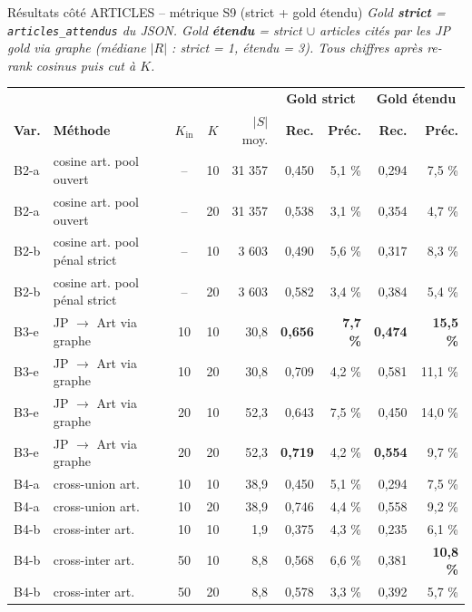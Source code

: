 \documentclass[aspectratio=169,10pt]{beamer}
\begin{document}
\begin{frame}{Résultats côté ARTICLES -- métrique S9 (strict + gold étendu)}
  \tiny
  \textit{Gold \textbf{strict} = \texttt{articles\_attendus} du JSON. \quad
  Gold \textbf{étendu} = strict $\cup$ articles cités par les JP gold via graphe
  (médiane $|R|$ : strict = 1, étendu = 3). \quad
  Tous chiffres après re-rank cosinus puis cut à $K$.}

  \vspace{0.3em}
  \scriptsize
  \renewcommand{\arraystretch}{1.05}
  \setlength{\tabcolsep}{3pt}
  \begin{center}
  \begin{tabular}{@{}l l c c r | r r | r r@{}}
    \toprule
    & & & & & \multicolumn{2}{c|}{\textbf{Gold strict}} & \multicolumn{2}{c}{\textbf{Gold étendu}} \\
    \textbf{Var.} & \textbf{Méthode}
    & $K_{\text{in}}$ & $K$ & $|S|$ moy.
    & \textbf{Rec.} & \textbf{Préc.}
    & \textbf{Rec.} & \textbf{Préc.} \\
    \midrule
    B2-a & cosine art. pool ouvert        & -- & 10 & 31 357 & 0,450 & 5,1 \% & 0,294 & 7,5 \% \\
    B2-a & cosine art. pool ouvert        & -- & 20 & 31 357 & 0,538 & 3,1 \% & 0,354 & 4,7 \% \\
    B2-b & cosine art. pool pénal strict  & -- & 10 & 3 603  & 0,490 & 5,6 \% & 0,317 & 8,3 \% \\
    B2-b & cosine art. pool pénal strict  & -- & 20 & 3 603  & 0,582 & 3,4 \% & 0,384 & 5,4 \% \\
    \midrule
    \rowcolor{accentsoft}
    B3-e & JP $\to$ Art via graphe        & 10 & 10 & 30,8   & \textbf{0,656} & \textbf{7,7 \%} & \textbf{0,474} & \textbf{15,5 \%} \\
    \rowcolor{accentsoft}
    B3-e & JP $\to$ Art via graphe        & 10 & 20 & 30,8   & 0,709 & 4,2 \% & 0,581 & 11,1 \% \\
    B3-e & JP $\to$ Art via graphe        & 20 & 10 & 52,3   & 0,643 & 7,5 \% & 0,450 & 14,0 \% \\
    \rowcolor{accentsoft}
    B3-e & JP $\to$ Art via graphe        & 20 & 20 & 52,3   & \textbf{0,719} & 4,2 \% & \textbf{0,554} & 9,7 \% \\
    \midrule
    B4-a & cross-union art.               & 10 & 10 & 38,9   & \textcolor{warn}{0,450} & 5,1 \% & 0,294 & 7,5 \% \\
    B4-a & cross-union art.               & 10 & 20 & 38,9   & 0,746 & 4,4 \% & 0,558 & 9,2 \% \\
    \midrule
    B4-b & cross-inter art.               & 10 & 10 & 1,9    & 0,375 & 4,3 \% & 0,235 & 6,1 \% \\
    B4-b & cross-inter art.               & 50 & 10 & 8,8    & 0,568 & 6,6 \% & 0,381 & \textbf{10,8 \%} \\
    B4-b & cross-inter art.               & 50 & 20 & 8,8    & 0,578 & 3,3 \% & 0,392 & 5,7 \% \\
    \bottomrule
  \end{tabular}
  \end{center}


\end{frame}
\end{document}
